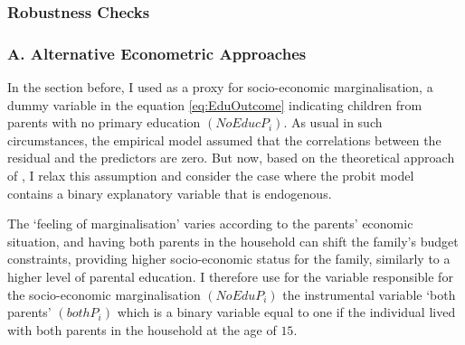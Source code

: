 \documentclass[a4paper, 12pt]{article}
\begin{document}







\subsubsection{Robustness Checks}



\subsubsection*{\small A. Alternative Econometric Approaches}


In the section before, I used as a proxy for socio-economic marginalisation, a dummy variable in the equation \eqref{eq:EduOutcome} indicating children from parents with no primary education $(NoEducP_i)$. As usual in such circumstances, the empirical model assumed that the correlations between the residual and the predictors are zero. But now, based on the theoretical approach of \citet{wooldridge2010econometric}, I relax this assumption and consider the case where the probit model contains a binary explanatory variable that is endogenous. 

The ‘feeling of marginalisation’ varies according to the parents’ economic situation, and having both parents in the household can shift the family’s budget constraints, providing higher socio-economic status for the family, similarly to a higher level of parental education. I therefore use for the variable responsible for the socio-economic marginalisation $(NoEduP_i)$ the instrumental variable ‘both parents’ $(bothP_i)$ which is a binary variable equal to one if the individual lived with both parents in the household at the age of $15$.
\end{document}
